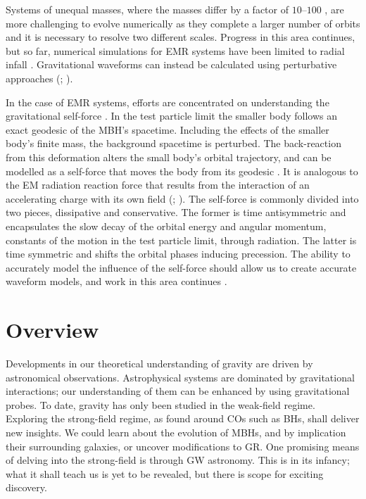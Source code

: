 Systems of unequal masses, where the masses differ by a factor of $10$--$100$ \citep{Lousto2010,Lousto2011}, are more challenging to evolve numerically as they complete a larger number of orbits and it is necessary to resolve two different scales. Progress in this area continues, but so far, numerical simulations for EMR systems have been limited to radial infall \citep{East2012}. Gravitational waveforms can instead be calculated using perturbative approaches (\citealt{Teukolsky1973}; \citealt[chapter 9]{Chandrasekhar1992}).

In the case of EMR systems, efforts are concentrated on understanding the gravitational self-force \citep{Barack2009,Poisson2004}. In the test particle limit the smaller body follows an exact geodesic of the MBH's spacetime. Including the effects of the smaller body's finite mass, the background spacetime is perturbed. The back-reaction from this deformation alters the small body's orbital trajectory, and can be modelled as a self-force that moves the body from its geodesic \citep{Mino1997,Quinn1997,Gralla2008}. It is analogous to the EM radiation reaction force that results from the interaction of an accelerating charge with its own field (\citealt{Dirac1938}; \citealt[sections 16.1--16.3]{Jackson1999}). The self-force is commonly divided into two pieces, dissipative and conservative. The former is time antisymmetric and encapsulates the slow decay of the orbital energy and angular momentum, constants of the motion in the test particle limit, through radiation. The latter is time symmetric and shifts the orbital phases inducing precession. The ability to accurately model the influence of the self-force should allow us to create accurate waveform models, and work in this area continues \citep[e.g.,][]{Pound2012}.

\section{Overview}

Developments in our theoretical understanding of gravity are driven by astronomical observations. Astrophysical systems are dominated by gravitational interactions; our understanding of them can be enhanced by using gravitational probes. To date, gravity has only been studied in the weak-field regime. Exploring the strong-field regime, as found around COs such as BHs, shall deliver new insights. We could learn about the evolution of MBHs, and by implication their surrounding galaxies, or uncover modifications to GR. One promising means of delving into the strong-field is through GW astronomy. This is in its infancy; what it shall teach us is yet to be revealed, but there is scope for exciting discovery.

